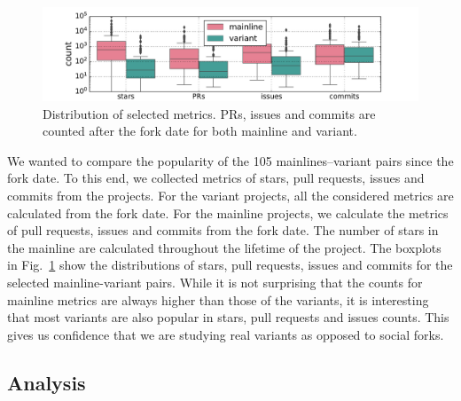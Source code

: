 \begin{figure}[ht]
\begin{center}
    \centering
    \includegraphics[width=\columnwidth]{pdfs/stats.pdf}
    \caption{Distribution of selected metrics. PRs, issues and commits are counted after the fork date for both mainline and variant.}
    \label{fig:stats}
\end{center}
\vspace{-.3cm}
\end{figure}

We wanted to compare the popularity of the 105 mainlines--variant pairs since the fork date. To this end, we collected metrics of stars, pull requests, issues and commits from the projects. For the variant projects, all the considered metrics are calculated from the fork date. For the mainline projects, we calculate the metrics  of pull requests, issues and commits from the fork date. The number of stars in the mainline are calculated throughout the lifetime of the project.
The boxplots in Fig.~\ref{fig:stats} show the distributions of stars, pull requests, issues and commits for the selected mainline-variant pairs. %
While it is not surprising that the counts for mainline metrics are always higher than those of the variants, it is interesting that most variants are also popular in stars, pull requests and issues counts. This gives us confidence that we are studying real variants as opposed to social forks.


\subsection{Analysis}
\label{sec:card_sorting}

